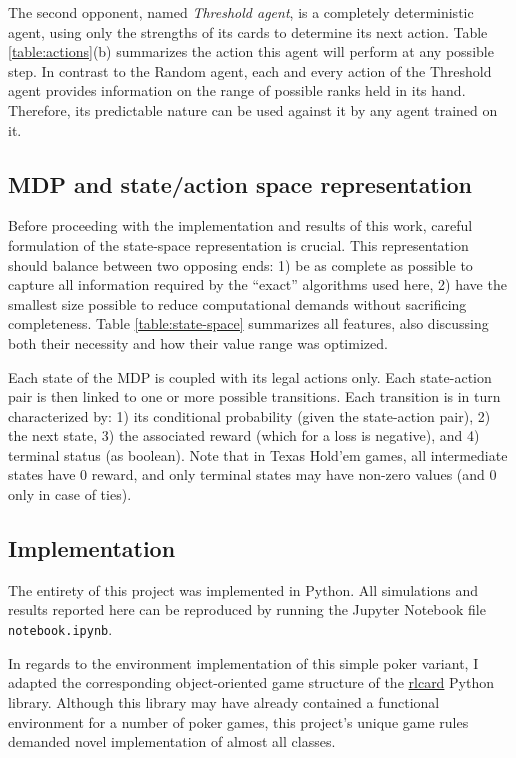 The second opponent, named \textit{Threshold agent}, is a completely deterministic agent, using only the strengths of its cards to determine its next action. Table \ref{table:actions}(b) summarizes the action this agent will perform at any possible step. In contrast to the Random agent, each and every action of the Threshold agent provides information on the range of possible ranks held in its hand. Therefore, its predictable nature can be used against it by any agent trained on it.

\subsection{MDP and state/action space representation}
\label{sec:state-space}

Before proceeding with the implementation and results of this work, careful formulation of the state-space representation is crucial. This representation should balance between two opposing ends: 1) be as complete as possible to capture all information required by the ``exact'' algorithms used here, 2) have the smallest size possible to reduce computational demands without sacrificing completeness. Table \ref{table:state-space} summarizes all features, also discussing both their necessity and how their value range was optimized.

Each state of the MDP is coupled with its legal actions only. Each state-action pair is then linked to one or more possible transitions. Each transition is in turn characterized by: 1) its conditional probability (given the state-action pair), 2) the next state, 3) the associated reward (which for a loss is negative), and 4) terminal status (as boolean). Note that in Texas Hold'em games, all intermediate states have 0 reward, and only terminal states may have non-zero values (and 0 only in case of ties).

\subsection{Implementation}

The entirety of this project was implemented in Python. All simulations and results reported here can be reproduced by running the Jupyter Notebook file \Verb|notebook.ipynb|.

In regards to the environment implementation of this simple poker variant, I adapted the corresponding object-oriented game structure of the \href{https://rlcard.org/}{rlcard} Python library. Although this library may have already contained a functional environment for a number of poker games, this project's unique game rules demanded novel implementation of almost all classes.

